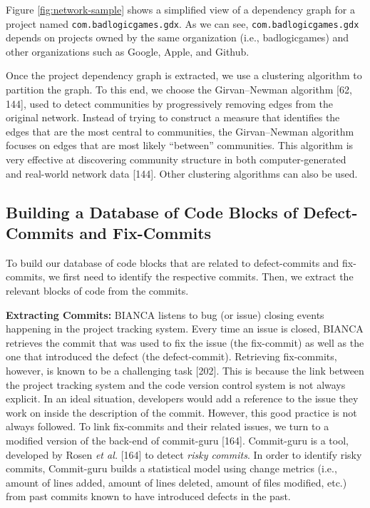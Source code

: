 \documentclass[12pt]{report}
\begin{document}
Figure \ref{fig:network-sample} shows a simplified view of a dependency
graph for a project named \texttt{com.badlogicgames.gdx}. As we can see,
\texttt{com.badlogicgames.gdx} depends on projects owned by the same
organization (i.e., badlogicgames) and other organizations such as
Google, Apple, and Github.



Once the project dependency graph is extracted, we use a clustering
algorithm to partition the graph. To this end, we choose the
Girvan--Newman algorithm {[}62, 144{]}, used to detect communities by
progressively removing edges from the original network. Instead of
trying to construct a measure that identifies the edges that are the
most central to communities, the Girvan--Newman algorithm focuses on
edges that are most likely ``between'' communities. This algorithm is
very effective at discovering community structure in both
computer-generated and real-world network data {[}144{]}. Other
clustering algorithms can also be used.

\subsection{Building a Database of Code Blocks of Defect-Commits and
Fix-Commits}\label{sec:offline}

To build our database of code blocks that are related to defect-commits
and fix-commits, we first need to identify the respective commits. Then,
we extract the relevant blocks of code from the commits.

\textbf{Extracting Commits:} BIANCA listens to bug (or issue) closing
events happening in the project tracking system. Every time an issue is
closed, BIANCA retrieves the commit that was used to fix the issue (the
fix-commit) as well as the one that introduced the defect (the
defect-commit). Retrieving fix-commits, however, is known to be a
challenging task {[}202{]}. This is because the link between the project
tracking system and the code version control system is not always
explicit. In an ideal situation, developers would add a reference to the
issue they work on inside the description of the commit. However, this
good practice is not always followed. To link fix-commits and their
related issues, we turn to a modified version of the back-end of
commit-guru {[}164{]}. Commit-guru is a tool, developed by Rosen
\emph{et al.} {[}164{]} to detect \emph{risky commits}. In order to
identify risky commits, Commit-guru builds a statistical model using
change metrics (i.e., amount of lines added, amount of lines deleted,
amount of files modified, etc.) from past commits known to have
introduced defects in the past.
\end{document}
